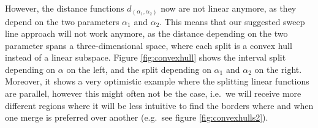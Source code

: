 However, the distance functions $d_{(\alpha_1, \alpha_2)}$ now are not linear anymore, as they depend on the two parameters $\alpha_1$ and $\alpha_2$. This means that our suggested sweep line approach will not work anymore, as the distance depending on the two parameter spans a three-dimensional space, where each split is a convex hull instead of a linear subspace. Figure \ref{fig:convexhull} shows the interval split depending on $\alpha$ on the left, and the split depending on $\alpha_1$ and $\alpha_2$ on the right. Moreover, it shows a very optimistic example where the splitting linear functions are parallel, however this might often not be the case, i.e.\ we will receive more different regions where it will be less intuitive to find the borders where and when one merge is preferred over another (e.g.\ see figure \ref{fig:convexhulls2}).

